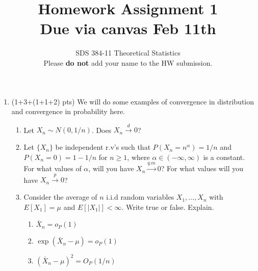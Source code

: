 \documentclass[11pt]{article}
\begin{document}
\title{{\bf Homework Assignment 1}\\Due via canvas Feb 11th}
\author{SDS 384-11 Theoretical Statistics\\Please \textbf{do not} add your name to the HW submission.}

\date{}

\maketitle{}
\begin{enumerate}%

\item (1+3+(1+1+2) pts) We will do some examples of convergence in distribution and convergence in probability here.
\begin{enumerate}
	\item Let $X_n\sim N(0,1/n)$. Does $X_n\stackrel{d}{\rightarrow} 0$?
	\item  Let $\{X_n\}$ be independent r.v's such that $P(X_n=n^\alpha)=1/n$ and $P(X_n=0)=1-1/n$ for $n\geq 1$, where $\alpha\in (-\infty,\infty)$ is a constant. For what values of $\alpha$, will you have $X_n\stackrel{q.m}{\rightarrow} 0$? For what values will you have $X_n\stackrel{p}{\rightarrow} 0$?
	\item Consider the average of $n$ i.i.d random variables $X_1,\dots, X_n$ with $E[X_1]=\mu$ and $E[|X_1|]< \infty$. Write true or false. Explain.
	\begin{enumerate}
		\item $\bar{X}_n=o_P(1)$
		\item $\exp(\bar{X}_n-\mu) =o_P(1)$
		\item $(\bar{X}_n-\mu)^2 =O_P(1/n)$
	\end{enumerate}
		

\end{enumerate}
\end{enumerate}
\end{document}

